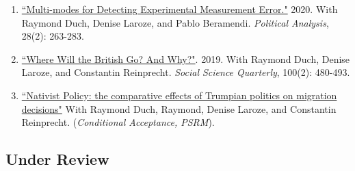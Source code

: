 \documentclass[11pt, a4paper]{article}
\begin{document}
 \begin{enumerate}

 \item \href{https://www.cambridge.org/core/journals/political-analysis/article/multimodes-for-detecting-experimental-measurement-error/37514FC46CF29C7B345DB9881E252150/share/7b059037b0da9182a33316d7f87b2de81b619592}{``Multi-modes for Detecting Experimental Measurement Error."} 2020. With Raymond Duch, Denise Laroze, and Pablo Beramendi. \textit{Political Analysis}, 28(2): 263-283.

 \item \href{https://doi.org/10.1111/ssqu.12584}{``Where Will the British Go? And Why?"}. 2019. With Raymond Duch, Denise Laroze, and Constantin Reinprecht. \textit{Social Science Quarterly}, 100(2): 480-493. 

 \item \href{http://raymondduch.com/files/Populism__Magnet_or_Deterrent_May2019.pdf}{``Nativist Policy: the comparative effects of Trumpian politics on migration decisions"} With Raymond Duch, Raymond, Denise Laroze, and Constantin Reinprecht. (\textit{Conditional Acceptance, PSRM}).


\end{enumerate}

\subsection*{Under Review}
\end{document}
